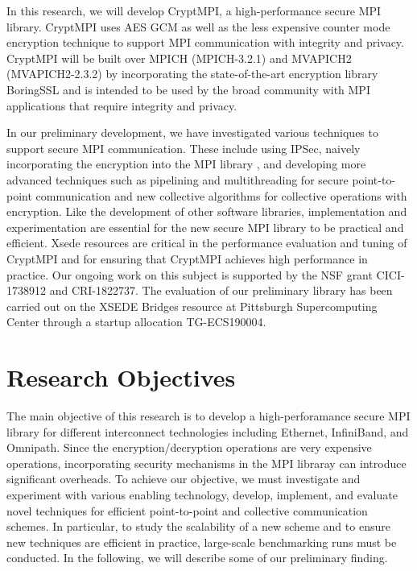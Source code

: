 In this research, we will develop CryptMPI, a high-performance secure MPI library.
CryptMPI uses AES GCM as well as the less expensive counter mode encryption technique
to support MPI communication with integrity and privacy.
CryptMPI will be built over MPICH (MPICH-3.2.1) and MVAPICH2 (MVAPICH2-2.3.2)
by incorporating the state-of-the-art encryption library BoringSSL and is intended
to be used by the broad community with MPI applications that require integrity
and privacy.

In our preliminary development, we have investigated various techniques to support
secure MPI communication. These include using IPSec, naively incorporating the
encryption into the MPI library \cite{Cluster:Naser19}, and developing more
advanced techniques such as pipelining and multithreading for secure
point-to-point communication and new collective algorithms for collective operations
with encryption. Like the development of other software libraries, implementation and
experimentation are essential for the new secure MPI library to be
practical and efficient. Xsede resources are critical in the performance
evaluation and tuning of CryptMPI and for ensuring that CryptMPI achieves high performance
in practice. Our ongoing work on this subject is supported by the NSF grant
CICI-1738912 and CRI-1822737. The evaluation of our preliminary library has been carried
out on the XSEDE Bridges resource at Pittsburgh Supercomputing Center through a
startup allocation TG-ECS190004. 

\section{Research Objectives}

The main objective of this research is to develop a high-perforamance secure MPI
library for different interconnect technologies including Ethernet, InfiniBand, and
Omnipath. Since the encryption/decryption operations are very expensive operations,
incorporating security mechanisms in the MPI libraray can introduce significant
overheads. To achieve our objective, we must investigate and experiment with various
enabling technology, develop, implement, and evaluate novel techniques for efficient
point-to-point and collective communication schemes. In particular, to study the
scalability of a new scheme and to ensure new techniques are efficient in practice,
large-scale benchmarking runs must be conducted. In the following, we will describe
some of our preliminary finding. 

